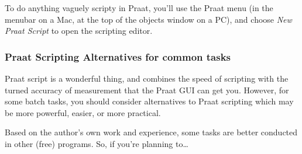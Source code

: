 To do anything vaguely scripty in Praat, you'll use the Praat menu (in
the menubar on a Mac, at the top of the objects window on a PC), and
choose \emph{New Praat Script} to open the scripting editor.

\hypertarget{praat-scripting-alternatives-for-common-tasks}{%
\subsubsection{Praat Scripting Alternatives for common
tasks}\label{praat-scripting-alternatives-for-common-tasks}}

\label{scriptingalternatives}

Praat script is a wonderful thing, and combines the speed of scripting
with the turned accuracy of measurement that the Praat GUI can get you.
However, for some batch tasks, you should consider alternatives to Praat
scripting which may be more powerful, easier, or more practical.

Based on the author's own work and experience, some tasks are better
conducted in other (free) programs. So, if you're planning to\ldots{}

